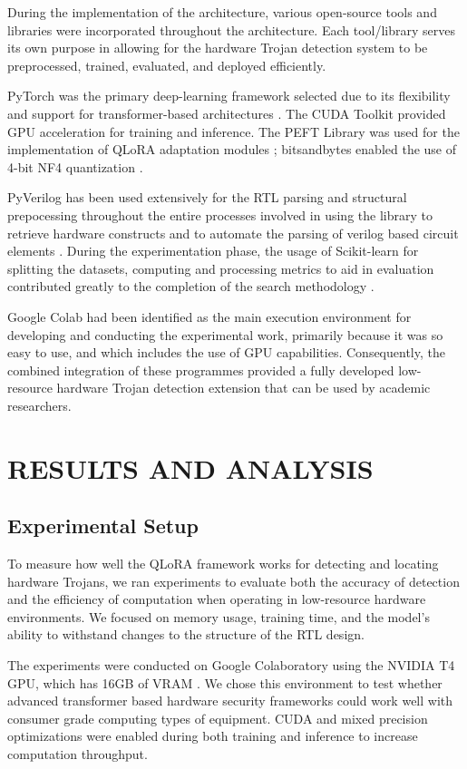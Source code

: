 \documentclass[12pt,a4paper]{report}
\begin{document}
During the implementation of the architecture, various open-source tools and libraries were incorporated throughout the architecture. Each tool/library serves its own purpose in allowing for the hardware Trojan detection system to be preprocessed, trained, evaluated, and deployed efficiently.

PyTorch was the primary deep-learning framework selected due to its flexibility and support for transformer-based architectures \cite{ref10}. The CUDA Toolkit provided GPU acceleration for training and inference. The PEFT Library was used for the implementation of QLoRA adaptation modules \cite{ref13}; bitsandbytes enabled the use of 4-bit NF4 quantization \cite{ref9}.

PyVerilog has been used extensively for the RTL parsing and structural prepocessing throughout the entire processes involved in using the library to retrieve hardware constructs and to automate the parsing of verilog based circuit elements \cite{ref12}. During the experimentation phase, the usage of Scikit-learn for splitting the datasets, computing and processing metrics to aid in evaluation contributed greatly to the completion of the search methodology \cite{ref14}.

Google Colab had been identified as the main execution environment for developing and conducting the experimental work, primarily because it was so easy to use, and which includes the use of GPU capabilities. Consequently, the combined integration of these programmes provided a fully developed low-resource hardware Trojan detection extension that can be used by academic researchers.


\chapter{RESULTS AND ANALYSIS}

\section{Experimental Setup}

To measure how well the QLoRA framework works for detecting and locating hardware Trojans, we ran experiments to evaluate both the accuracy of detection and the efficiency of computation when operating in low-resource hardware environments. We focused on memory usage, training time, and the model's ability to withstand changes to the structure of the RTL design.

The experiments were conducted on Google Colaboratory using the NVIDIA T4 GPU, which has 16GB of VRAM \cite{ref9}. We chose this environment to test whether advanced transformer based hardware security frameworks could work well with consumer grade computing types of equipment. CUDA and mixed precision optimizations were enabled during both training and inference to increase computation throughput.
\end{document}
